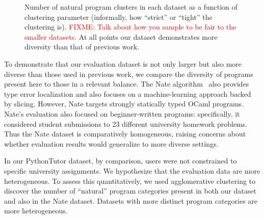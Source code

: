 \documentclass[conference]{IEEEtran}
\newcommand{\fixme}[1]{\textcolor{red}{FIXME: #1}}
\begin{document}
\begin{figure}
\caption{Number of natural program clusters in each dataset as a function
of clustering parameter (informally, how ``strict'' or ``tight'' the
clustering is). \fixme{Talk about how you sample to be fair to the smaller
datasets.} At all points our dataset demonstrates more diversity than
that of previous work.}
\label{fig-diversity}
\end{figure}

To demonstrate that our evaluation dataset is not only larger but also more
diverse than those used in previous work, we compare the diversity of
programs present here to those in a relevant balance. The Nate
algorithm~\cite{learning-to-blame} also provides type error localization
and also focuses on a machine-learning approach backed by slicing. However,
Nate targets strongly statically typed OCaml programs. Nate's evaluation
also focused on beginner-written programs: specifically, it considered
student submissions to 23 different university homework problems.  Thus the
Nate dataset is comparatively homogeneous, raising concerns about whether
evaluation results would generalize to more diverse settings.

In our PythonTutor dataset, by comparison, users were not constrained to
specific university assignments. We hypothesize that the evaluation data are
more heterogeneous. To assess this quantitatively, we used agglomerative
clustering to discover the number of ``natural'' program categories
present in both our dataset and also in the Nate dataset. Datasets with
more distinct program categories are more heterogeneous.

\end{document}
